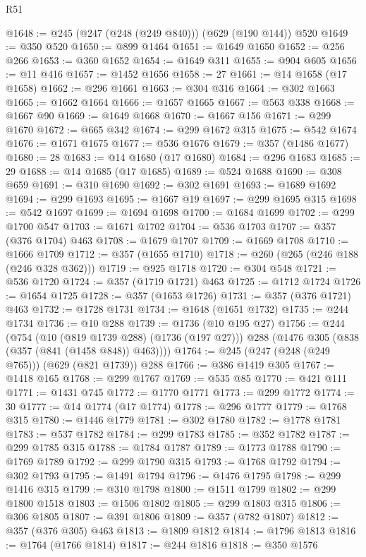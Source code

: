 \begin{lexlean}{R51}
\begin{coremodule}
@1648 := @245 (@247 (@248 (@249 @840))) (@629 (@190 @144)) @520
@1649 := @350 @520
@1650 := @899 @1464
@1651 := @1649 @1650
@1652 := @256 @266
@1653 := @360 @1652
@1654 := @1649 @311
@1655 := @904 @605
@1656 := @11 @416
@1657 := @1452 @1656
@1658 := 27
@1661 := @14 @1658 (@17 @1658)
@1662 := @296 @1661
@1663 := @304 @316
@1664 := @302 @1663
@1665 := @1662 @1664
@1666 := @1657 @1665
@1667 := @563 @338
@1668 := @1667 @90
@1669 := @1649 @1668
@1670 := @1667 @156
@1671 := @299 @1670
@1672 := @665 @342
@1674 := @299 @1672 @315
@1675 := @542 @1674
@1676 := @1671 @1675
@1677 := @536 @1676
@1679 := @357 (@1486 @1677)
@1680 := 28
@1683 := @14 @1680 (@17 @1680)
@1684 := @296 @1683
@1685 := 29
@1688 := @14 @1685 (@17 @1685)
@1689 := @524 @1688
@1690 := @308 @659
@1691 := @310 @1690
@1692 := @302 @1691
@1693 := @1689 @1692
@1694 := @299 @1693
@1695 := @1667 @19
@1697 := @299 @1695 @315
@1698 := @542 @1697
@1699 := @1694 @1698
@1700 := @1684 @1699
@1702 := @299 @1700 @547
@1703 := @1671 @1702
@1704 := @536 @1703
@1707 := @357 (@376 @1704) @463
@1708 := @1679 @1707
@1709 := @1669 @1708
@1710 := @1666 @1709
@1712 := @357 (@1655 @1710)
@1718 := @260 (@265 (@246 @188 (@246 @328 @362)))
@1719 := @925 @1718
@1720 := @304 @548
@1721 := @536 @1720
@1724 := @357 (@1719 @1721) @463
@1725 := @1712 @1724
@1726 := @1654 @1725
@1728 := @357 (@1653 @1726)
@1731 := @357 (@376 @1721) @463
@1732 := @1728 @1731
@1734 := @1648 (@1651 @1732)
@1735 := @244 @1734
@1736 := @10 @288
@1739 := @1736 (@10 @195 @27)
@1756 := @244
    (@754
      (@10 (@819 @1739 @288) (@1736 (@197 @27)))
      @288
      (@1476 @305 (@838 (@357 (@841 (@1458 @848)) @463))))
@1764 := @245 (@247 (@248 (@249 @765))) (@629 (@821 @1739)) @288
@1766 := @386 @1419 @305
@1767 := @1418 @165
@1768 := @299 @1767
@1769 := @535 @85
@1770 := @421 @111
@1771 := @1431 @745
@1772 := @1770 @1771
@1773 := @299 @1772
@1774 := 30
@1777 := @14 @1774 (@17 @1774)
@1778 := @296 @1777
@1779 := @1768 @315
@1780 := @1446 @1779
@1781 := @302 @1780
@1782 := @1778 @1781
@1783 := @537 @1782
@1784 := @299 @1783
@1785 := @352 @1782
@1787 := @299 @1785 @315
@1788 := @1784 @1787
@1789 := @1773 @1788
@1790 := @1769 @1789
@1792 := @299 @1790 @315
@1793 := @1768 @1792
@1794 := @302 @1793
@1795 := @1491 @1794
@1796 := @1476 @1795
@1798 := @299 @1416 @315
@1799 := @310 @1798
@1800 := @1511 @1799
@1802 := @299 @1800 @1518
@1803 := @1506 @1802
@1805 := @299 @1803 @315
@1806 := @306 @1805
@1807 := @391 @1806
@1809 := @357 (@782 @1807)
@1812 := @357 (@376 @305) @463
@1813 := @1809 @1812
@1814 := @1796 @1813
@1816 := @1764 (@1766 @1814)
@1817 := @244 @1816
@1818 := @350 @1576

\end{coremodule}
\end{lexlean}
